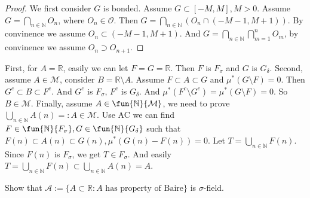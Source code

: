 \documentclass{ctexart}
\begin{document}
\begin{proof}
  We first consider \(G\) is bonded. Assume \(G \subset [-M,M],M >0\). Assume \(G =\bigcap_{n \in \mathbb{N}} O_n\), where \(O_n \in \mathcal{O}\). 
  Then \(G=\bigcap_{n \in \mathbb{N}} (O_n \cap (-M-1,M+1))\). By convinence we assume \(O_n \subset (-M-1,M+1)\). 
  And \(G=\bigcap_{n \in \mathbb{N}} \bigcap_{m=1}^n O_m \), by convinence we assume \(O_n \supset O_{n+1} \). 
  
\end{proof}
\begin{solution}
  First, for \(A=\mathbb{R}\), easily we can let \(F=G=\mathbb{R}\). Then \(F\) is \(F_{\sigma}\) and \(G\) is \(G_{\delta}\). 
  Second, assume \(A \in \mathcal{M}\), consider \(B=\mathbb{R}\setminus A\). 
  Assume \(F \subset A \subset G\) and \(\mu^{*}(G\setminus F)=0\). Then \(G^c \subset B \subset F^c\). 
  And \(G^c\) is \(F_{\sigma}\), \(F^c\) is \(G_{\delta}\). And \(\mu^{*}(F^c\setminus G^c)=\mu^{*}(G\setminus F)=0\). 
  So \(B \in \mathcal{M}\). 
  Finally, assume \(A \in \fun{\mathbb{N}}{\mathcal{M}}\), we need to prove \(\bigcup_{n \in \mathbb{N}} A(n) =:A\in \mathcal{M}\). 
  Use AC we can find \(F \in \fun{ \mathbb{N}}{F_{\sigma}},G \in \fun{ \mathbb{N}}{G_{\delta}}\) such that \(F(n)\subset A(n) \subset G(n),\mu^{*}(G(n)-F(n))=0\). 
  Let \(T=\bigcup_{n \in \mathbb{N}} F(n)\). Since \(F(n)\) is \(F_{\sigma}\), we get \(T \in F_{\sigma}\). 
  And easily \(T=\bigcup_{n \in \mathbb{N}} F(n) \subset \bigcup_{n \in \mathbb{N}} A(n)=A\). 
\end{solution}

\begin{problem}
  Show that \(\mathcal{A}:=\{A \subset \mathbb{R}:A \text{ has property of Baire}\}\) is \(\sigma\)-field. 
\end{problem}
\end{document}

